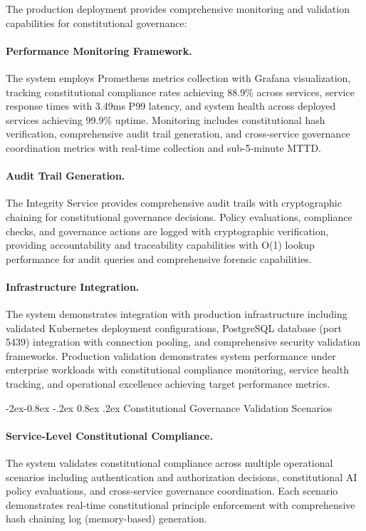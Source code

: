 \documentclass[manuscript,screen,9pt]{acmart}
\makeatletter
\renewcommand\subsubsection{\@startsection{subsubsection}{3}{\z@}%
  {-2ex\@plus -0.8ex \@minus -.2ex}%
  {0.8ex \@plus .2ex}%
  {\normalfont\normalsize\bfseries}}
\makeatother
\begin{document}
The production deployment provides comprehensive monitoring and validation capabilities for constitutional governance:

\paragraph{Performance Monitoring Framework.} The system employs Prometheus metrics collection with Grafana visualization, tracking constitutional compliance rates achieving 88.9\% across services, service response times with 3.49ms P99 latency, and system health across deployed services achieving 99.9\% uptime. Monitoring includes constitutional hash verification, comprehensive audit trail generation, and cross-service governance coordination metrics with real-time collection and sub-5-minute MTTD.

\paragraph{Audit Trail Generation.} The Integrity Service provides comprehensive audit trails with cryptographic chaining for constitutional governance decisions. Policy evaluations, compliance checks, and governance actions are logged with cryptographic verification, providing accountability and traceability capabilities with O(1) lookup performance for audit queries and comprehensive forensic capabilities.

\paragraph{Infrastructure Integration.} The system demonstrates integration with production infrastructure including validated Kubernetes deployment configurations, PostgreSQL database (port 5439) integration with connection pooling, and comprehensive security validation frameworks. Production validation demonstrates system performance under enterprise workloads with constitutional compliance monitoring, service health tracking, and operational excellence achieving target performance metrics.

\subsubsection{Constitutional Governance Validation Scenarios}
\label{subsubsec:governance_scenarios}

\paragraph{Service-Level Constitutional Compliance.} The system validates constitutional compliance across multiple operational scenarios including authentication and authorization decisions, constitutional AI policy evaluations, and cross-service governance coordination. Each scenario demonstrates real-time constitutional principle enforcement with comprehensive hash chaining log (memory-based) generation.
\end{document}
